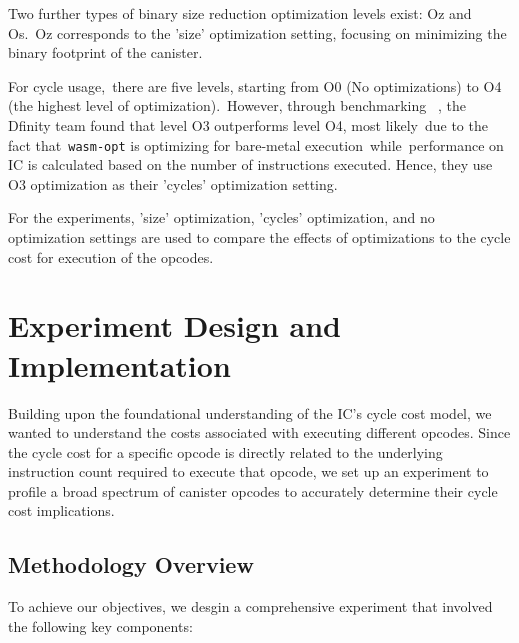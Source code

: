 Two further types of binary size reduction optimization levels exist: Oz and Os. Oz corresponds to the 'size' optimization setting, focusing on minimizing the binary footprint of the canister.

For cycle usage, there are five levels, starting from O0 (No optimizations) to O4 (the highest level of optimization). However, through benchmarking ~\cite{canisterOptimisingBenchmarking}, the Dfinity team found that level O3 outperforms level O4, most likely due to the fact that \texttt{wasm-opt} is optimizing for bare-metal execution while performance on IC is calculated based on the number of instructions executed. Hence, they use O3 optimization as their 'cycles' optimization setting.

For the experiments, 'size' optimization, 'cycles' optimization, and no optimization settings are used to compare the effects of optimizations to the cycle cost for execution of the opcodes.









\section{Experiment Design and Implementation}

Building upon the foundational understanding of the IC’s cycle cost model, we wanted to understand the costs associated with executing different opcodes. Since the cycle cost for a specific opcode is directly related to the underlying instruction count required to execute that opcode, we set up an experiment to profile a broad spectrum of canister opcodes to accurately determine their cycle cost implications.


\subsection{Methodology Overview}
To achieve our objectives, we desgin a comprehensive experiment that involved the following key components:

